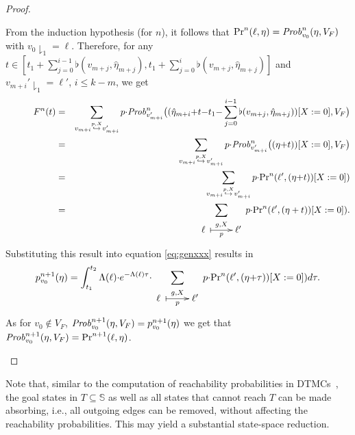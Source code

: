 \documentclass{LMCS}
\makeatletter
\newcommand{\<}{\langle}
\renewcommand{\>}{\rangle}
\newcommand{\Prob}{{\it Prob}}
\newcommand{\updownmapsto}[4]{\xymatrix{#1\;\ar @{|->}[r]^{#2}_{#3}&#4}}
\makeatother
\begin{document}
\begin{proof}
\begin{enumerate}[(1)]
\begin{equation*}
\end{equation*}
From the induction hypothesis (for $n$), it follows that $\Pr^{n}(\ell,\eta) =
\Prob^{n}_{v_0}(\eta,V_F)$ with $v_0{\downharpoonright_1}=\ell$.
Therefore, for any $t\in[t_1+\sum_{j=0}^{i-1}\flat(v_{m+j},\hat\eta_{m+j}),t_1+\sum_{j=0}^{i}
\flat(v_{m+j},\hat\eta_{m+j})]$  and
$v_{m+i}'{\downharpoonright_1}=\ell'$, $i\leqslant k-m$, we get
\begin{eqnarray*}
\quad \quad \quad
F^{n}(t)
& = &
\sum_{v_{m+i}\stackrel{p,X}{\hookrightarrow}v_{m+i}'}p{\cdot}{\Prob}^{n}_{v_{m+i}'}
\big((\hat\eta_{m+i}{+}t{-}t_1{-}\sum_{j=0}^{i-1} \flat(v_{m+j},\hat\eta_{m+j}))[X:=0],V_F \big)\\
&=&
\sum_{v_{m+i}\stackrel{p,X}{\hookrightarrow}v_{m+i}'}p{\cdot}{\Prob}^{n}_{v_{m+i}'}
\big((\eta{+}t))[X:=0],V_F \big)\\
&=&
\sum_{v_{m+i}\stackrel{p,X}{\hookrightarrow}v_{m+i}'}p{\cdot}{\Pr}^{n}(\ell',(\eta{+}t))[X:=0])\\
&=&\sum_{\updownmapsto{\ell}
{g,X}{p}{\ell'}}p{\cdot}{\Pr}^{n}(\ell',(\eta+t))[X:=0]).
\end{eqnarray*}
\noindent
Substituting this result into equation \eqref{eq:genxxx} results in
\begin{equation*}
p_{v_0}^{n+1}(\eta)=\int_{t_1}^{t_2} \Lambda(\ell){\cdot}e^{
-\Lambda(\ell)\tau}{\cdot}\sum_{\updownmapsto{\ell}
{g,X}{p}{\ell'}}p{\cdot}{\Pr}^{n}(\ell',(\eta{+}\tau))[X:=0])d\tau.
\end{equation*}
As for $v_0\notin V_F$,
$\Prob_{v_0}^{n+1}(\eta,V_F)=p_{v_0}^{n+1}(\eta)$ we get that
$\Prob_{v_0}^{n+1}(\eta,V_F)={\Pr}^{n+1}(\ell,\eta)$.
\end{enumerate}
\end{proof}
Note that, similar to the computation of reachability probabilities in DTMCs~\cite{HJ94},
the goal states in $T \subseteq \mathbb{S}$ as well as all states that cannot reach $T$
can be made absorbing, i.e., all outgoing edges can be removed, without affecting the
reachability probabilities.  This may yield a substantial state-space reduction.
\end{document}
